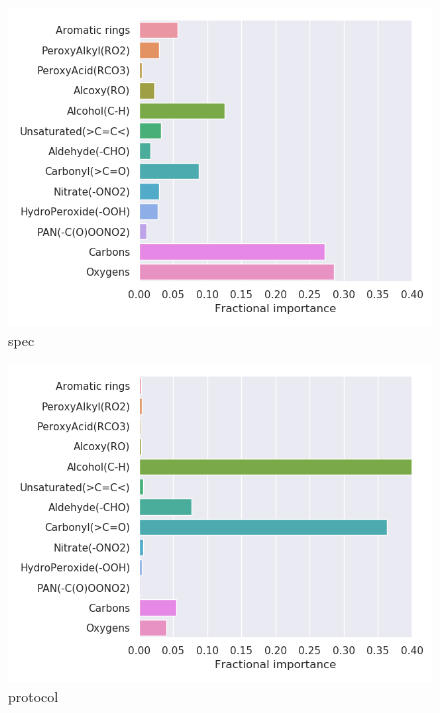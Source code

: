 \begin{subfigure}[b]{0.4\textwidth}
    \centering
    \includegraphics[width=\textwidth]{outputs/AE/spec/legend.png}
    \caption{spec}
    \label{fig:legend_AE_spec}
\end{subfigure}
\begin{subfigure}[b]{0.4\textwidth}
    \centering
    \includegraphics[width=\textwidth]{outputs/AE/protocol/legend.png}
    \caption{protocol}
    \label{fig:legend_AE_protocol}
\end{subfigure}
